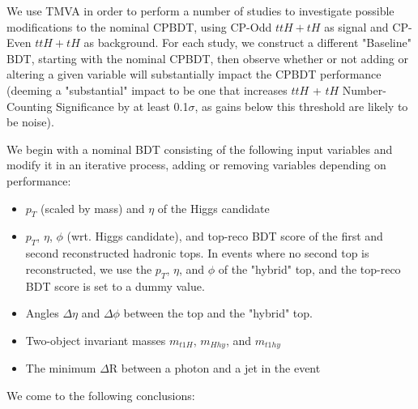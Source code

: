 We use TMVA in order to perform a number of studies to investigate possible modifications to the nominal CPBDT, using CP-Odd $ttH+tH$ as signal and CP-Even $ttH+tH$ as background. For each study, we construct a different "Baseline" BDT, starting with the nominal CPBDT, then observe whether or not adding or altering a given variable will substantially impact the CPBDT performance (deeming a "substantial" impact to be one that increases $ttH$ + $tH$ Number-Counting Significance by at least 0.1$\sigma$, as gains below this threshold are likely to be noise).

We begin with a nominal BDT consisting of the following input variables and modify it in an iterative process, adding or removing variables depending on performance:

\begin{itemize}
\item $p_{T}$ (scaled by mass) and $\eta$ of the Higgs candidate
\item $p_{T}$, $\eta$, $\phi$ (wrt. Higgs candidate), and top-reco BDT score of the first and second reconstructed hadronic tops. In events where no second top is reconstructed, we use the $p_{T}$, $\eta$, and $\phi$ of the "hybrid" top, and the top-reco BDT score is set to a dummy value.
\item Angles $\Delta\eta$ and $\Delta\phi$ between the top and the "hybrid" top.
\item Two-object invariant masses $m_{t1H}$, $m_{Hhy}$, and $m_{t1hy}$
\item The minimum $\Delta$R between a photon and a jet in the event
\end{itemize}

We come to the following conclusions:

